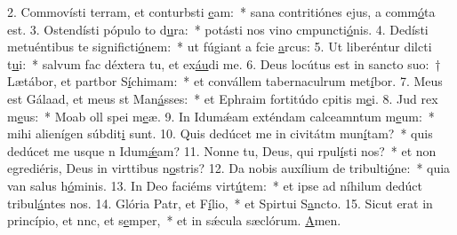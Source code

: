 2. Commovísti terram, et conturbsti \uline{e}am:~* sana contritiónes ejus, a comm\uline{ó}ta est.
3. Ostendísti pópulo to d\uline{u}ra:~* potásti nos vino cmpuncti\uline{ó}nis.
4. Dedísti metuéntibus te significti\uline{ó}nem:~* ut fúgiant a fcie \uline{a}rcus:
5. Ut liberéntur dilcti t\uline{u}i:~* salvum fac déxtera tu, et ex\uline{áu}di me.
6. Deus locútus est in sancto suo:~† Lætábor, et partbor S\uline{í}chimam:~* et convállem tabernaculrum met\uline{í}bor.
7. Meus est Gálaad, et meus st Man\uline{á}sses:~* et Ephraim fortitúdo cpitis m\uline{e}i.
8. Jud rex m\uline{e}us:~* Moab oll spei m\uline{e}æ.
9. In Idumǽam exténdam calceamntum m\uline{e}um:~* mihi alienígen súbdit\uline{i} sunt.
10. Quis dedúcet me in civitátm mun\uline{í}tam?~* quis dedúcet me usque n Idum\uline{ǽ}am?
11. Nonne tu, Deus, qui rpul\uline{í}sti nos?~* et non egrediéris, Deus in virttibus n\uline{o}stris?
12. Da nobis auxílium de tribulti\uline{ó}ne:~* quia van salus h\uline{ó}minis.
13. In Deo faciéms virt\uline{ú}tem:~* et ipse ad níhilum dedúct tribul\uline{á}ntes nos.
14. Glória Patr, et F\uline{í}lio,~* et Spirtui S\uline{a}ncto.
15. Sicut erat in princípio, et nnc, et s\uline{e}mper,~* et in sǽcula sæclórum. \uline{A}men.
